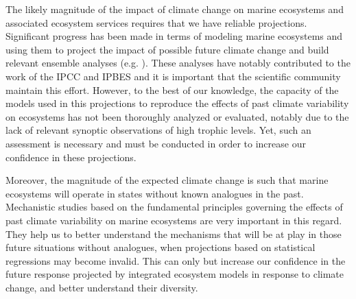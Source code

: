The likely magnitude of the impact of climate change on marine ecosystems and associated ecosystem services requires that we have reliable projections. Significant progress has been made in terms of modeling marine ecosystems and using them to project the impact of possible future climate change and build relevant ensemble analyses (e.g. \citealp{lotzeGlobalEnsembleProjections2019, tittensorNextgenerationEnsembleProjections2021}). These analyses have notably contributed to the work of the IPCC \citep{portnerIPCCSpecialReport2019, portnerClimateChange20222022} and IPBES \citep{brondizioGlobalAssessmentReport2019} and it is important that the scientific community maintain this effort. However, to the best of our knowledge, the capacity of the models used in this projections to reproduce the effects of past climate variability on ecosystems has not been thoroughly analyzed or evaluated, notably due to the lack of relevant synoptic observations of high trophic levels. Yet, such an assessment is necessary and must be conducted in order to increase our confidence in these projections.

Moreover, the magnitude of the expected climate change is such that marine ecosystems will operate in states without known analogues in the past. Mechanistic studies based on the fundamental principles governing the effects of past climate variability on marine ecosystems are very important in this regard. They help us to better understand the mechanisms that will be at play in those future situations without analogues, when projections based on statistical regressions may become invalid. This can only but increase our confidence in the future response projected by integrated ecosystem models in response to climate change, and better understand their diversity.